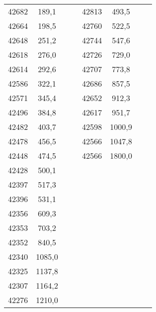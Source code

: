 \documentclass[11pt]{article}
\begin{document}
{{\begin{tabular}{|c|c|c|c|c|c|c|c|}
            \cline{1-2} \cline{5-6} 
            42682 & 189,1 &  &  & 42813 & 493,5 &  & \tabularnewline
            \cline{1-2} \cline{5-6} 
            42664 & 198,5 &  &  & 42760 & 522,5 &  & \tabularnewline
            \cline{1-2} \cline{5-6} 
            42648 & 251,2 &  &  & 42744 & 547,6 &  & \tabularnewline
            \cline{1-2} \cline{5-6} 
            42618 & 276,0 &  &  & 42726 & 729,0 &  & \tabularnewline
            \cline{1-2} \cline{5-6} 
            42614 & 292,6 &  &  & 42707 & 773,8 &  & \tabularnewline
            \cline{1-2} \cline{5-6} 
            42586 & 322,1 &  &  & 42686 & 857,5 &  & \tabularnewline
            \cline{1-2} \cline{5-6} 
            42571 & 345,4 &  &  & 42652 & 912,3 &  & \tabularnewline
            \cline{1-2} \cline{5-6} 
            42496 & 384,8 &  &  & 42617 & 951,7 &  & \tabularnewline
            \cline{1-2} \cline{5-6} 
            42482 & 403,7 &  &  & 42598 & 1000,9 &  & \tabularnewline
            \cline{1-2} \cline{5-6} 
            42478 & 456,5 &  &  & 42566 & 1047,8 &  & \tabularnewline
            \cline{1-2} \cline{5-6} 
            42448 & 474,5 &  &  & 42566 & 1800,0 &  & \tabularnewline
            \cline{1-2} \cline{5-6} 
            42428 & 500,1 &  & \multicolumn{1}{c}{} & \multicolumn{1}{c}{} & \multicolumn{1}{c}{} &  & \tabularnewline
            \cline{1-2} 
            42397 & 517,3 &  & \multicolumn{1}{c}{} & \multicolumn{1}{c}{} & \multicolumn{1}{c}{} &  & \tabularnewline
            \cline{1-2} 
            42396 & 531,1 &  & \multicolumn{1}{c}{} & \multicolumn{1}{c}{} & \multicolumn{1}{c}{} &  & \tabularnewline
            \cline{1-2} 
            42356 & 609,3 &  & \multicolumn{1}{c}{} & \multicolumn{1}{c}{} & \multicolumn{1}{c}{} &  & \tabularnewline
            \cline{1-2} 
            42353 & 703,2 &  & \multicolumn{1}{c}{} & \multicolumn{1}{c}{} & \multicolumn{1}{c}{} &  & \tabularnewline
            \cline{1-2} 
            42352 & 840,5 &  & \multicolumn{1}{c}{} & \multicolumn{1}{c}{} & \multicolumn{1}{c}{} &  & \tabularnewline
            \cline{1-2} 
            42340 & 1085,0 &  & \multicolumn{1}{c}{} & \multicolumn{1}{c}{} & \multicolumn{1}{c}{} &  & \tabularnewline
            \cline{1-2} 
            42325 & 1137,8 &  & \multicolumn{1}{c}{} & \multicolumn{1}{c}{} & \multicolumn{1}{c}{} &  & \tabularnewline
            \cline{1-2} 
            42307 & 1164,2 &  & \multicolumn{1}{c}{} & \multicolumn{1}{c}{} & \multicolumn{1}{c}{} &  & \tabularnewline
            \cline{1-2} 
            42276 & 1210,0 &  & \multicolumn{1}{c}{} & \multicolumn{1}{c}{} & \multicolumn{1}{c}{} &  & \tabularnewline

\end{tabular}}}
\end{document}
